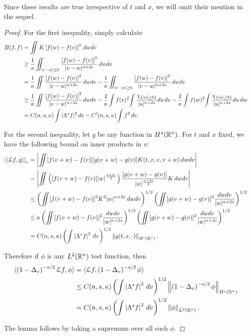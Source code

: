 Since these results are true irrespective of $t$ and $x$, we will omit their mention in the sequel.  

\begin{proof}
For the first inequality, simply calculate
\begin{align*}
B(f, f) &= \iint K \left[ f(w) - f(v) \right]^2 \,dwdv
\\ &\geq \frac{1}{\kappa} \iint_{|v-w| \leq 6}  \frac{\left[ f(w) - f(v) \right]^2}{|v-w|^{n+2s}} \,dwdv
\\ &= \frac{1}{\kappa} \iint \frac{\left[ f(w) - f(v) \right]^2}{|v-w|^{n+2s}} \,dwdv - \frac{1}{\kappa} \iint_{|v-w| \geq 6}  \frac{\left[ f(w) - f(v) \right]^2}{|v-w|^{n+2s}} \,dwdv
\\ &\geq \frac{1}{\kappa} \iint \frac{\left[ f(w) - f(v) \right]^2}{|v-w|^{n+2s}} \,dwdv - \frac{2}{\kappa} \int f(v)^2 {\int  \frac{\chi_{\{|u|\geq 6\}}}{|u|^{n+2s}} du} \,dv - \frac{2}{\kappa} \int f(w)^2 {\int \frac{\chi_{\{|u|\geq 6\}}}{|u|^{n+2s}} du} \,dw
\\ &	= C(n,s,\kappa) \int |\Lambda^s f|^2 \, dv - C'(n,s,\kappa) \int f^2 \,dv.
\end{align*}

For the second inequality, let $g$ be any function in $H^s(\mathbb{R}^n)$.  For $t$ and $x$ fixed, we have the following bound on inner products in $v$:
\begin{align*}
\left\lvert \langle \mathcal{L} f, g \rangle \right\rvert_v &= \left\lvert \iint [f(v+w)-f(v)][g(v+w) - g(v)] K(t,x,v,v+w) \,dwdv \right\rvert
\\ &= \left\lvert \iint \left( [f(v+w)-f(v)]|w|^{\frac{n+2s}{2}} \right)\frac{[g(v+w) - g(v)]}{|w|^{\frac{n+2s}{2}}} K \,dwdv \right\rvert
\\ &\leq \left( \iint [f(v+w)-f(v)]^2 K^2 |w|^{n+2s} \,dwdv \right)^{1/2} \left( \iint [g(v+w) - g(v)]^{2} \frac{dwdv}{|w|^{n+2s}} \right)^{1/2}
\\ &\leq \kappa \left( \iint [f(v+w)-f(v)]^2 \frac{dwdv}{|w|^{n+2s}} \right)^{1/2} \left( \iint [g(v+w) - g(v)]^{2} \frac{dwdv}{|w|^{n+2s}} \right)^{1/2}
\\ &= C(n,s,\kappa) \left( \int \left\lvert \Lambda^s f \right\rvert^2 \,dv \right)^{1/2} \left\lVert g(t,x,\cdot)\right\rVert_{H^s(\mathbb{R}^n)}.
\end{align*}

Therefore if $\phi$ is any $L^{2}(\mathbb{R}^n)$ test function, then
\begin{align*}
\langle \left( 1-\Delta_v \right)^{-s/2}\mathcal{L} f,\phi \rangle &= \langle \mathcal{L} f,\left( 1-\Delta_v \right)^{-s/2}\phi \rangle
\\ &\leq C(n,s,\kappa) \left( \int \left\lvert \Lambda^s f \right\rvert^2 \,dv \right)^{1/2}  \left\lVert\left( 1-\Delta_v \right)^{-s/2}\phi\right\rVert_{H^s(\mathbb{R}^n)}
\\ &= C(n,s,\kappa) \left( \int \left\lvert \Lambda^s f \right\rvert^2 \,dv \right)^{1/2} \left\lVert\phi\right\rVert_{L^2(\mathbb{R}^n)}.
\end{align*}

The lemma follows by taking a supremum over all such $\phi$.  

\end{proof}

